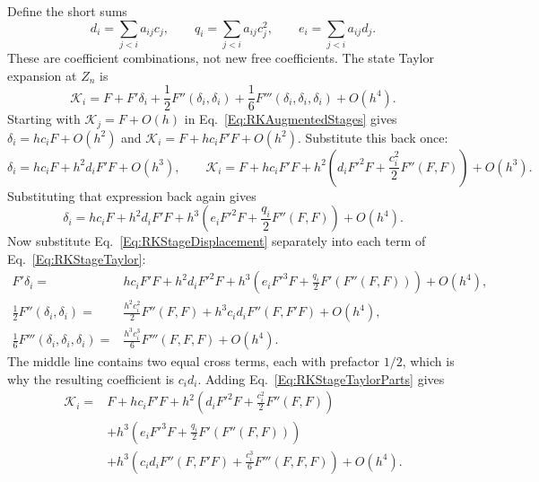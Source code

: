 Define the short sums
\begin{equation}\label{Eq:RKStageSums}
 d_i=\sum_{j<i}a_{ij}c_j,\qquad
 q_i=\sum_{j<i}a_{ij}c_j^2,\qquad
 e_i=\sum_{j<i}a_{ij}d_j.
\end{equation}
These are coefficient combinations, not new free coefficients.
The state Taylor expansion at $Z_n$ is
\begin{equation}\label{Eq:RKStageTaylor}
 \mathcal K_i=F+F'\delta_i+\frac12F''(\delta_i,\delta_i)
                   +\frac16F'''(\delta_i,\delta_i,\delta_i)+O(h^4).
\end{equation}
Starting with $\mathcal K_j=F+O(h)$ in Eq.~\ref{Eq:RKAugmentedStages}
gives $\delta_i=hc_iF+O(h^2)$ and
$\mathcal K_i=F+hc_iF'F+O(h^2)$. Substitute this back once:
\[
 \delta_i=hc_iF+h^2d_iF'F+O(h^3),\qquad
 \mathcal K_i=F+hc_iF'F
     +h^2\left(d_iF'^2F+\frac{c_i^2}{2}F''(F,F)\right)+O(h^3).
\]
Substituting that expression back again gives
\begin{equation}\label{Eq:RKStageDisplacement}
 \delta_i=hc_iF+h^2d_iF'F
   +h^3\left(e_iF'^2F+\frac{q_i}{2}F''(F,F)\right)+O(h^4).
\end{equation}
Now substitute Eq.~\ref{Eq:RKStageDisplacement} separately into each term
of Eq.~\ref{Eq:RKStageTaylor}:
\begin{align}
 F'\delta_i={}&hc_iF'F+h^2d_iF'^2F
   +h^3\left(e_iF'^3F+\frac{q_i}{2}F'(F''(F,F))\right)+O(h^4),
   \nonumber\\
 \frac12F''(\delta_i,\delta_i)={}&\frac{h^2c_i^2}{2}F''(F,F)
                  +h^3c_id_iF''(F,F'F)+O(h^4),\nonumber\\
 \frac16F'''(\delta_i,\delta_i,\delta_i)={}&
                    \frac{h^3c_i^3}{6}F'''(F,F,F)+O(h^4).
 \label{Eq:RKStageTaylorParts}
\end{align}
The middle line contains two equal cross terms, each with prefactor
$1/2$, which is why the resulting coefficient is $c_id_i$.
Adding Eq.~\ref{Eq:RKStageTaylorParts} gives
\begin{equation}\label{Eq:RKStageExpansionThroughCubic}
\begin{aligned}
 \mathcal K_i={}&F+hc_iF'F
       +h^2\left(d_iF'^2F+\frac{c_i^2}{2}F''(F,F)\right)\\
 &+h^3\left(e_iF'^3F+\frac{q_i}{2}F'(F''(F,F))\right)\\
 &+h^3\left(c_id_iF''(F,F'F)
                         +\frac{c_i^3}{6}F'''(F,F,F)\right)+O(h^4).
\end{aligned}
\end{equation}

